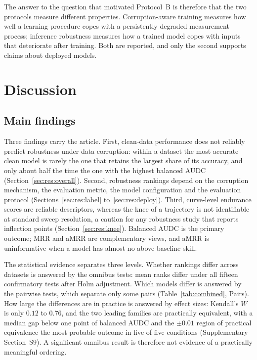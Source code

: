 \documentclass[pdflatex,sn-mathphys]{sn-jnl}
\theoremstyle{thmstyleone}
\theoremstyle{thmstyletwo}
\theoremstyle{thmstylethree}
\begin{document}
The answer to the question that motivated Protocol~B is therefore that the two protocols measure different properties. Corruption-aware training measures how well a learning procedure copes with a persistently degraded measurement process; inference robustness measures how a trained model copes with inputs that deteriorate after training. Both are reported, and only the second supports claims about deployed models.


\section{Discussion}\label{sec:discussion}

\subsection{Main findings}\label{sec:disc:findings}

Three findings carry the article. First, clean-data performance does not reliably predict robustness under data corruption: within a dataset the most accurate clean model is rarely the one that retains the largest share of its accuracy, and only about half the time the one with the highest balanced AUDC (Section~\ref{sec:res:overall}). Second, robustness rankings depend on the corruption mechanism, the evaluation metric, the model configuration and the evaluation protocol (Sections~\ref{sec:res:label} to~\ref{sec:res:deploy}). Third, curve-level endurance scores are reliable descriptors, whereas the knee of a trajectory is not identifiable at standard sweep resolution, a caution for any robustness study that reports inflection points (Section~\ref{sec:res:knee}). Balanced AUDC is the primary outcome; MRR and aMRR are complementary views, and aMRR is uninformative when a model has almost no above-baseline skill.

The statistical evidence separates three levels. Whether rankings differ across datasets is answered by the omnibus tests: mean ranks differ under all fifteen confirmatory tests after Holm adjustment. Which models differ is answered by the pairwise tests, which separate only some pairs (Table~\ref{tab:combined}, Pairs). How large the differences are in practice is answered by effect sizes: Kendall's $W$ is only $0.12$ to $0.76$, and the two leading families are practically equivalent, with a median gap below one point of balanced AUDC and the $\pm0.01$ region of practical equivalence the most probable outcome in five of five conditions (Supplementary Section~S9). A significant omnibus result is therefore not evidence of a practically meaningful ordering.
\end{document}
